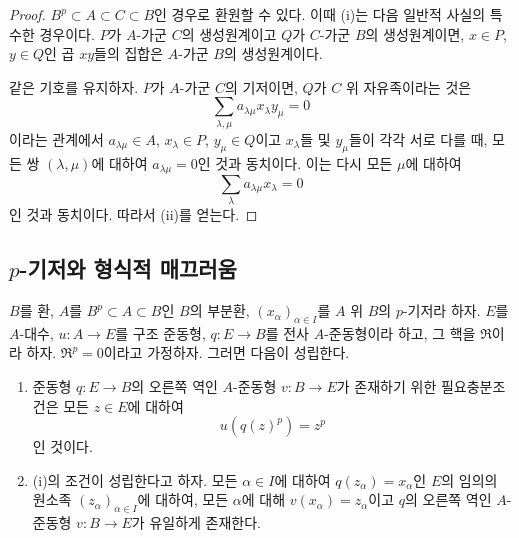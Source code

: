 \begin{proof}
$B^p\subset A\subset C\subset B$인 경우로 환원할 수 있다. 이때 (i)는
다음 일반적 사실의 특수한 경우이다. $P$가 $A$-가군 $C$의 생성원계이고
$Q$가 $C$-가군 $B$의 생성원계이면, $x\in P$, $y\in Q$인 곱
$xy$들의 집합은 $A$-가군 $B$의 생성원계이다.

같은 기호를 유지하자. $P$가 $A$-가군 $C$의 기저이면, $Q$가 $C$
위 자유족이라는 것은
\[
  \sum_{\lambda,\mu}a_{\lambda\mu}x_\lambda y_\mu=0
\]
이라는 관계에서 $a_{\lambda\mu}\in A$, $x_\lambda\in P$,
$y_\mu\in Q$이고 $x_\lambda$들 및 $y_\mu$들이 각각 서로 다를 때,
모든 쌍 $(\lambda,\mu)$에 대하여 $a_{\lambda\mu}=0$인 것과 동치이다.
이는 다시 모든 $\mu$에 대하여
\[
  \sum_\lambda a_{\lambda\mu}x_\lambda=0
\]
인 것과 동치이다. 따라서 (ii)를 얻는다.
\end{proof}

\subsection{$p$-기저와 형식적 매끄러움}
\label{subsection:0.21.2-ko}

\begin{theorem}[21.2.1]
\label{0.21.2.1-ko}
$B$를 환, $A$를 $B^p\subset A\subset B$인 $B$의 부분환,
$(x_\alpha)_{\alpha\in I}$를 $A$ 위 $B$의 $p$-기저라 하자.
$E$를 $A$-대수, $u:A\to E$를 구조 준동형,
$q:E\to B$를 전사 $A$-준동형이라 하고, 그 핵을 $\mathfrak R$이라
하자. $\mathfrak R^p=0$이라고 가정하자. 그러면 다음이 성립한다.
\begin{enumerate}
  \item[(i)] 준동형 $q:E\to B$의 오른쪽 역인 $A$-준동형
  $v:B\to E$가 존재하기 위한 필요충분조건은 모든 $z\in E$에 대하여
  \[
    u(q(z)^p)=z^p
  \]
  인 것이다.
  \item[(ii)] (i)의 조건이 성립한다고 하자. 모든 $\alpha\in I$에
  대하여 $q(z_\alpha)=x_\alpha$인 $E$의 임의의 원소족
  $(z_\alpha)_{\alpha\in I}$에 대하여, 모든 $\alpha$에 대해
  $v(x_\alpha)=z_\alpha$이고 $q$의 오른쪽 역인 $A$-준동형
  $v:B\to E$가 유일하게 존재한다.
\end{enumerate}
\end{theorem}

